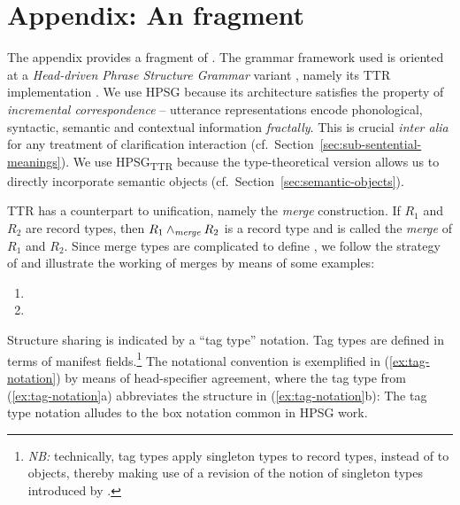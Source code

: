 \documentclass[output=paper,biblatex,babelshorthands,newtxmath,draftmode,colorlinks,citecolor=brown]{langscibook}
\begin{document}
\section*{Appendix: An \HPSGTTR fragment}

The appendix provides a fragment of \HPSGTTR.
%
The grammar framework used is oriented at a \textit{Head-driven Phrase Structure Grammar} variant \citep{Sag:Wasow:Bender:2003}, namely its TTR implementation \citep{Cooper:2008}.
%
We use HPSG because its  architecture satisfies the property of \emph{incremental correspondence} \citep{Johnson:Lappin:1999} -- utterance representations encode phonological, syntactic, semantic and contextual information \emph{fractally}.
%
 This is crucial {\it inter alia} for any treatment of clarification interaction (cf.\ Section~\ref{sec:sub-sentential-meanings}). 
%
We use HPSG\textsubscript{TTR} because the type-theoretical version allows us to directly incorporate semantic objects (cf.\ Section~\ref{sec:semantic-objects}).


TTR has a counterpart to unification, namely the \emph{merge} construction.
%
\ea
\ea If $R_1$ and $R_2$ are record types, then $R_1 \wedge_{\textit{merge}} R_2$ is a record type and is called the \emph{merge} of $R_1$ and $R_2$.
\ex Since merge types are complicated to define \citep[but see][]{Cooper:2012}, we follow the strategy of \citet{Cooper:2017:a} and illustrate the working of merges by means of some examples:
\begin{enumerate}[label=(\roman*), leftmargin=6.5em]
\item 
\avm{
[a & : T \\
b & : R]
\ttrmerge
[c & : S]
=
[a & : T \\
b & : R \\
c & : S]
}
\item 
\avm{
[a & : T ]
\ttrmerge
[a & : R]
=
[a & : T \ttrmerge\ R]
}
\end{enumerate}
\z
\z

\largerpage[-1]
Structure sharing is indicated by a \enquote{tag type} notation.
%
Tag types are defined in terms of manifest fields.\footnote{\textit{NB:} technically, tag types apply singleton types to record types, instead of to objects, thereby making use of a revision of the notion of singleton types introduced by \citet[4, footnote~3]{Cooper:2013}.}
%
The notational convention is exemplified in (\ref{ex:tag-notation}) by means of head-specifier agreement, where the tag type from (\ref{ex:tag-notation}a) abbreviates the structure in (\ref{ex:tag-notation}b):
%
\ea \label{ex:tag-notation}
\ea
{}
\ex 
{}
\z
\z 
%
The tag type notation alludes to the box notation common in HPSG work.
\pagebreak
\end{document}
